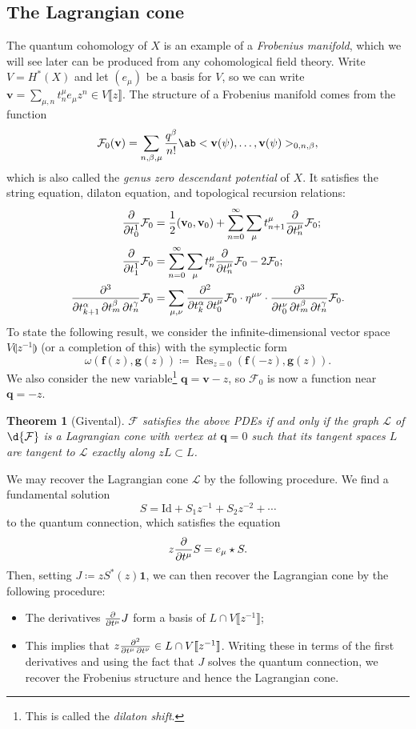 \documentclass{amsart}
\newtheorem{thm}{Theorem}[section]
\theoremstyle{definition}
\theoremstyle{remark}
\theoremstyle{plain}
\theoremstyle{definition}
\theoremstyle{remark}
\newcommand{\mc}[1]{\mathcal{#1}}
\newcommand{\mbf}[1]{\mathbf{#1}}
\newcommand{\bv}{\mbf{v}}
\newcommand{\bq}{\mbf{q}}
\newcommand{\mr}[1]{\mathrm{#1}}
\newcommand{\on}[1]{\operatorname{#1}}
\newcommand{\1}{\mathbf{1}}
\newcommand{\2}{\mathbf{2}}
\newcommand{\3}{\mathbf{3}}
\newcommand{\ps}[1]{\llbracket #1 \rrbracket}
\newcommand{\ls}[1]{\llparenthesis #1 \rrparenthesis}
\begin{document}
\subsection{The Lagrangian cone}%
\label{sub:The Lagrangian cone}

The quantum cohomology of \(X\) is an example of a \textit{Frobenius manifold}, which we will see later can be produced from any cohomological field theory. Write \(V = H^*(X)\) and let \((e_{\mu})\) be a basis for \(V\), so we can write $\bv = \sum_{\mu,n} t^{\mu}_n e_{\mu} z^n \in V\ps{z}$.
The structure of a Frobenius manifold comes from the function
\[
    \mc{F}_0(\bv) = \sum_{n, \beta, \mu} \frac{q^{\beta}}{n!} \ab<\bv(\psi), \ldots, \bv(\psi)>_{0,n,\beta},
\]
which is also called the \textit{genus zero descendant potential} of \(X\). It satisfies the string equation, dilaton equation, and topological recursion relations: 
\begin{align*}
    \pdv{}{t_0^1} \mc{F}_0 &= \frac{1}{2} (\bv_0, \bv_0) + \sum_{n=0}^{\infty} \sum_{\mu} t_{n+1}^{\mu} \pdv{}{t_n^{\mu}} \mc{F}_0; \\
    \pdv{}{t_1^1} \mc{F}_0 &= \sum_{n=0}^{\infty} \sum_{\mu} t_n^{\mu} \pdv{}{t_n^{\mu}}\mc{F}_0 - 2 \mc{F}_0; \\
    \pdv{}{t_{k+1}^{\alpha},t_m^{\beta},t_n^{\gamma}} \mc{F}_0 &= \sum_{\mu,\nu} \pdv{}{t_k^{\alpha},t_0^{\mu}} \mc{F}_0 \cdot \eta^{\mu\nu} \cdot \pdv{}{t_0^{\nu},t_{m}^{\beta},t_n^{\gamma}} \mc{F}_0.
\end{align*}
To state the following result, we consider the infinite-dimensional vector space $V\ls{z^{-1}}$ (or a completion of this) with the symplectic form
\[ \omega(\mbf{f}(z), \mbf{g}(z)) \coloneqq \on{Res}_{z=0}(\mbf{f}(-z), \mbf{g}(z)). \]
We also consider the new variable\footnote{This is called the \textit{dilaton shift}.} $\bq = \bv - z$, so $\mc{F}_0$ is now a function near $\bq = -z$.

\begin{thm}[Givental]
    $\mc{F}$ satisfies the above PDEs if and only if the graph $\mc{L}$ of $\d{\mc{F}}$ is a Lagrangian cone with vertex at $\bq = 0$ such that its tangent spaces $L$ are tangent to $\mc{L}$ exactly along $zL \subset L$.
\end{thm}

We may recover the Lagrangian cone $\mc{L}$ by the following procedure. We find a fundamental solution 
\[ S = \mr{Id} + S_1 z^{-1} + S_2 z^{-2} + \cdots \]
to the quantum connection, which satisfies the equation
\[ z \pdv{}{t^{\mu}}S = e_{\mu} \star S. \]
Then, setting $J \coloneqq z S^*(z) \1$, we can then recover the Lagrangian cone by the following procedure:
\begin{itemize}
    \item The derivatives $\pdv{}{t^{\mu}} J$ form a basis of $L \cap V\ps{z^{-1}}$;
    \item This implies that $z \pdv{}{t^{\mu},t^{\nu}} \in L \cap V \ps{z^{-1}}$. Writing these in terms of the first derivatives and using the fact that $J$ solves the quantum connection, we recover the Frobenius structure and hence the Lagrangian cone.
\end{itemize}
\end{document}
